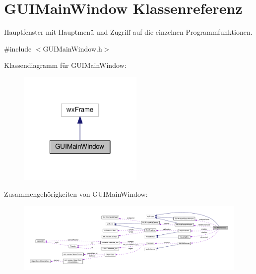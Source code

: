 \hypertarget{classGUIMainWindow}{\section{G\-U\-I\-Main\-Window Klassenreferenz}
\label{classGUIMainWindow}
}


Hauptfenster mit Hauptmenü und Zugriff auf die einzelnen Programmfunktionen.  




{\ttfamily \#include $<$G\-U\-I\-Main\-Window.\-h$>$}



Klassendiagramm für G\-U\-I\-Main\-Window\-:
\nopagebreak
\begin{figure}[H]
\begin{center}
\leavevmode
\includegraphics[width=170pt]{classGUIMainWindow__inherit__graph}
\end{center}
\end{figure}


Zusammengehörigkeiten von G\-U\-I\-Main\-Window\-:
\nopagebreak
\begin{figure}[H]
\begin{center}
\leavevmode
\includegraphics[width=350pt]{classGUIMainWindow__coll__graph}
\end{center}
\end{figure}
